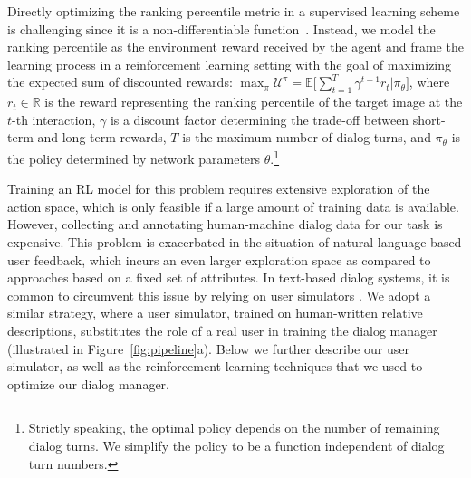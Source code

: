 Directly optimizing the ranking percentile metric in a supervised learning scheme
is challenging since it is a non-differentiable function~\cite{li2016multiple,wang2018lambdaloss}. 
Instead, we model the ranking percentile as the environment reward received by the agent and
frame the learning process in a reinforcement learning setting with the goal of 
maximizing the expected sum of discounted rewards:
$\max_{\pi} \mathcal{U^{\pi}} = \mathbb{E} \big[ \sum_{t=1}^{T} \gamma^{t-1} r_{t} | \pi_\theta \big]$, where $r_{t}\in \mathbb{R}$ is the reward representing the ranking percentile 
of the target image at the $t$-th interaction, $\gamma$ is a discount factor determining 
the trade-off between short-term and long-term rewards, 
$T$ is the maximum number 
of dialog turns, 
and $\pi_\theta$ is the policy determined by network parameters $\theta$.\footnote{Strictly speaking, the optimal policy depends on the number of remaining dialog turns. We simplify the policy to be a function independent of dialog turn numbers.} 

Training an RL model for this problem requires extensive exploration 
of the action space, which is only feasible if a large amount of training data is available. 
However, collecting and annotating human-machine dialog data for our task is expensive. 
This problem is exacerbated in the situation of natural language based user feedback, 
which incurs an even larger exploration space as compared to approaches based on a fixed set of attributes. 
In text-based dialog systems, it is common to circumvent this 
issue by relying on user simulators \cite{li2016user}. We adopt a similar strategy, 
where a user simulator, trained on human-written relative descriptions, substitutes the 
role of a real user in training the dialog manager (illustrated in Figure~\ref{fig:pipeline}a). 
Below we further describe our user simulator, as well as the reinforcement learning techniques that we used to optimize our dialog manager.

